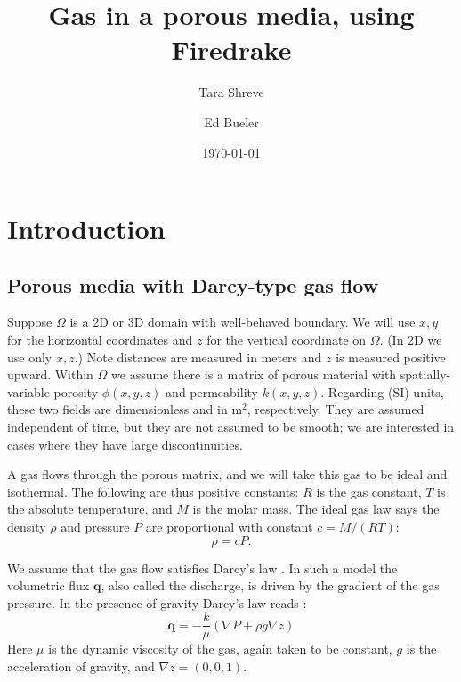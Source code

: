 \documentclass[11pt]{amsart}
\title{Gas in a porous media, using Firedrake}
\author{Tara Shreve}
\author{Ed Bueler}
\date{\today}
\newcommand{\bq}{\mathbf{q}}
\newcommand{\grad}{\nabla}
\begin{document}
\maketitle

\thispagestyle{empty}

\section{Introduction}

\subsection{Porous media with Darcy-type gas flow}  Suppose $\Omega$ is a 2D or 3D domain with well-behaved boundary.  We will use $x,y$ for the horizontal coordinates and $z$ for the vertical coordinate on $\Omega$.  (In 2D we use only $x,z$.)  Note distances are measured in meters and $z$ is measured positive upward.  Within $\Omega$ we assume there is a matrix of porous material with spatially-variable porosity $\phi(x,y,z)$ and permeability $k(x,y,z)$.  Regarding (SI) units, these two fields are dimensionless and in $\text{m}^2$, respectively.  They are assumed independent of time, but they are not assumed to be smooth; we are interested in cases where they have large discontinuities.

A gas flows through the porous matrix, and we will take this gas to be ideal and isothermal.  The following are thus positive constants: $R$ is the gas constant, $T$ is the absolute temperature, and $M$ is the molar mass.  The ideal gas law says the density $\rho$ and pressure $P$ are proportional with constant $c = M/(RT)$:
\begin{equation}
\rho = c P.  \label{eq:ideal}
\end{equation}

We assume that the gas flow satisfies Darcy's law \citep{Fowler2011}.  In such a model the volumetric flux $\bq$, also called the discharge, is driven by the gradient of the gas pressure.  In the presence of gravity Darcy's law reads \citep{Collinson2012}:
\begin{equation}
\bq = - \frac{k}{\mu} \left(\grad P + \rho g \grad z\right) \label{eq:darcy}
\end{equation}
Here $\mu$ is the dynamic viscosity of the gas, again taken to be constant, $g$ is the acceleration of gravity, and $\grad z = (0,0,1)$.  
\end{document}
